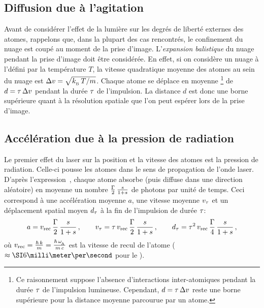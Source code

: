 \subsection{Diffusion due à l'agitation \thiq}\label{sec:FiabilitéImageThiq}
Avant de considérer l'effet de la lumière sur les degrés de liberté externes des atomes, rappelons que, dans la plupart des cas rencontrés, le confinement du nuage est coupé au moment de la prise d'image. L'\emph{expansion balistique} du nuage pendant la prise d'image doit être considérée. En effet, si on considère un nuage à l'\eqthdy défini par la température $T$, la vitesse quadratique moyenne des atomes au sein du nuage est ${\Delta v}=\sqrt{{{{k_{_{\rm B}}}\,T} / {m}}}$. Chaque atome se déplace en moyenne%
\footnote{Ce raisonnement suppose l'absence d'interactions inter-atomiques pendant la durée ${\tau}$ de l'impulsion lumineuse. Cependant, $d={\tau}\,{\Delta v}$ reste une borne supérieure pour la distance moyenne parcourue par un atome.}
 de $d={\tau}\,{\Delta v}$ pendant la durée ${\tau}$ de l'impulsion. La distance $d$ est donc une borne supérieure quant à la résolution spatiale que l'on peut espérer lors de la prise d'image.

\casse

\subsection{Accélération due à la pression de radiation}
Le premier effet du laser sur la position et la vitesse des atomes est la pression de radiation. Celle-ci pousse les atomes dans le sens de propagation de l'onde laser. D'après l'expression~, chaque atome absorbe (puis diffuse dans une direction aléatoire) en moyenne  un nombre 
$\tfrac{{\Gamma}}{2}\,\tfrac{{s}}{1+{s}}$
de photons par unité de temps. Ceci correspond à une accélération moyenne $a$, une vitesse moyenne $v_{\tau}$ et un déplacement spatial moyen $d_{\tau}$ à la fin de l'impulsion de durée ${\tau}$:
\[
	a = {v_{\rm rec}} \, \frac{{\Gamma}}{2}\,\frac{{s}}{1+{s}}
\, ,
\qquad
	v_{\tau} = {\tau} \, {v_{\rm rec}} \, \frac{{\Gamma}}{2}\,\frac{{s}}{1+{s}} 
\, ,
\qquad
	d_{\tau} = {\tau}^2 \, {v_{\rm rec}} \, \frac{{\Gamma}}{4}\,\frac{{s}}{1+{s}} 
\, ,
\]
où ${v_{\rm rec}} = \tfrac{\hbar\,k}{m} = \tfrac{\hbar\,{\omega_{_{\hspace{-1pt}{\rm A}}}}}{m\,c}$ est la vitesse de recul de l'atome ($\approx\mmps{6}$ pour le \Rb).

